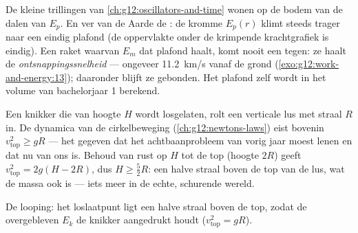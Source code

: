 \begin{remark}\label{rem:g12:work-and-energy:escape}
De kleine trillingen van \cref{ch:g12:oscillators-and-time} wonen op de bodem
van de dalen van $E_p$. En ver van de Aarde  de : de kromme
$E_p(r)$ klimt steeds trager naar een eindig plafond (de oppervlakte onder de
krimpende krachtgrafiek is eindig). Een raket waarvan $E_m$ dat plafond haalt,
komt nooit een  tegen: ze haalt de
\emph{ontsnappingssnelheid} --- ongeveer
\qty{11.2}{km/s} vanaf de grond (\cref{exo:g12:work-and-energy:13}); daaronder
blijft ze gebonden. Het plafond zelf wordt in het volume van bachelorjaar 1
berekend.
\end{remark}

\begin{example}[De looping]\label{ex:g12:work-and-energy:loop}
Een knikker die van hoogte $H$ wordt losgelaten, rolt een verticale lus met
straal $R$ in. De dynamica van de cirkelbeweging
(\cref{ch:g12:newtons-laws}) eist bovenin $v_{\text{top}}^2 \geq gR$ --- het
gegeven dat het achtbaanprobleem van vorig jaar moest lenen en dat nu van ons
is. Behoud van rust op $H$ tot de top (hoogte $2R$) geeft
$v_{\text{top}}^2 = 2g(H - 2R)$, dus $H \geq \tfrac52 R$: een halve straal
boven de top van de lus, wat de massa ook is --- iets meer in de echte,
schurende wereld.
\end{example}

\begin{omfigure}

{\small De looping: het loslaatpunt ligt een halve straal boven de top, zodat
de overgebleven $E_k$ de knikker aangedrukt houdt ($v_{\text{top}}^2 = gR$).}
\end{omfigure}

